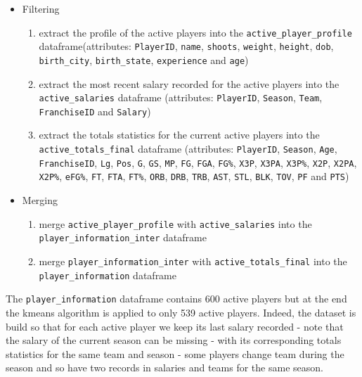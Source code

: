 \begin{itemize}
\item Filtering
	\begin{enumerate}
	\item extract the profile of the active players into the \texttt{active\_player\_profile} dataframe(attributes: \texttt{PlayerID}, \texttt{name}, \texttt{shoots}, \texttt{weight}, \texttt{height}, \texttt{dob}, \\ \texttt{birth\_city}, \texttt{birth\_state}, \texttt{experience} and \texttt{age})
	\item extract the most recent salary recorded for the active players into the \texttt{active\_salaries} dataframe (attributes: \texttt{PlayerID}, \texttt{Season}, \texttt{Team},\\ \texttt{FranchiseID} and \texttt{Salary})
	\item extract the totals statistics for the current active players into the \\ \texttt{active\_totals\_final} dataframe (attributes: \texttt{PlayerID}, \texttt{Season}, \texttt{Age},\\ \texttt{FranchiseID}, \texttt{Lg}, \texttt{Pos}, \texttt{G}, \texttt{GS}, \texttt{MP}, \texttt{FG}, \texttt{FGA}, \texttt{FG\%}, \texttt{X3P}, \texttt{X3PA}, \texttt{X3P\%}, \texttt{X2P}, \texttt{X2PA}, \texttt{X2P\%}, \texttt{eFG\%}, \texttt{FT}, \texttt{FTA}, \texttt{FT\%}, \texttt{ORB}, \texttt{DRB}, \texttt{TRB}, \texttt{AST}, \texttt{STL}, \texttt{BLK}, \texttt{TOV}, \texttt{PF} and \texttt{PTS})
	\end{enumerate}
\item Merging
	\begin{enumerate}
	\item merge \texttt{active\_player\_profile} with \texttt{active\_salaries} into the \\ \texttt{player\_information\_inter} dataframe
	\item merge \texttt{player\_information\_inter} with \texttt{active\_totals\_final} into the \texttt{player\_information} dataframe
	\end{enumerate}
\end{itemize}

The \texttt{player\_information} dataframe contains 600 active players but at the end the kmeans algorithm is applied to only 539 active players. Indeed, the dataset is build so that for each active player we keep its last salary recorded - note that the salary of the current season can be missing - with its corresponding totals statistics for the same team and season - some players change team during the season and so have two records in salaries and teams for the same season.

